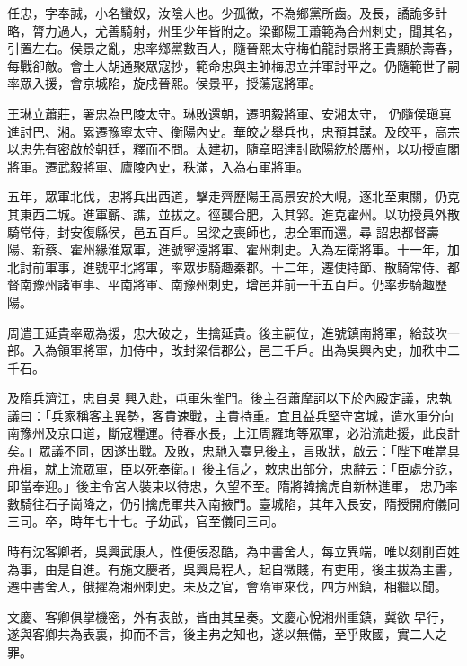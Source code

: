 \begin{pinyinscope}
 任忠，字奉誠，小名蠻奴，汝陰人也。少孤微，不為鄉黨所齒。及長，譎詭多計略，膂力過人，尤善騎射，州里少年皆附之。梁鄱陽王蕭範為合州刺史，聞其名，引置左右。侯景之亂，忠率鄉黨數百人，隨晉熙太守梅伯龍討景將王貴顯於壽春，每戰卻敵。會土人胡通聚眾寇抄，範命忠與主帥梅思立并軍討平之。仍隨範世子嗣率眾入援，會京城陷，旋戍晉熙。侯景平，授蕩寇將軍。



 王琳立蕭莊，署忠為巴陵太守。琳敗還朝，遷明毅將軍、安湘太守，
 仍隨侯瑱真進討巴、湘。累遷豫寧太守、衡陽內史。華皎之舉兵也，忠預其謀。及皎平，高宗以忠先有密啟於朝廷，釋而不問。太建初，隨章昭達討歐陽紇於廣州，以功授直閣將軍。遷武毅將軍、廬陵內史，秩滿，入為右軍將軍。



 五年，眾軍北伐，忠將兵出西道，擊走齊歷陽王高景安於大峴，逐北至東關，仍克其東西二城。進軍蘄、譙，並拔之。徑襲合肥，入其郛。進克霍州。以功授員外散騎常侍，封安復縣侯，邑五百戶。呂梁之喪師也，忠全軍而還。尋
 詔忠都督壽陽、新蔡、霍州緣淮眾軍，進號寧遠將軍、霍州刺史。入為左衛將軍。十一年，加北討前軍事，進號平北將軍，率眾步騎趣秦郡。十二年，遷使持節、散騎常侍、都督南豫州諸軍事、平南將軍、南豫州刺史，增邑并前一千五百戶。仍率步騎趣歷陽。



 周遣王延貴率眾為援，忠大破之，生擒延貴。後主嗣位，進號鎮南將軍，給鼓吹一部。入為領軍將軍，加侍中，改封梁信郡公，邑三千戶。出為吳興內史，加秩中二千石。



 及隋兵濟江，忠自吳
 興入赴，屯軍朱雀門。後主召蕭摩訶以下於內殿定議，忠執議曰：「兵家稱客主異勢，客貴速戰，主貴持重。宜且益兵堅守宮城，遣水軍分向南豫州及京口道，斷寇糧運。待春水長，上江周羅珣等眾軍，必沿流赴援，此良計矣。」眾議不同，因遂出戰。及敗，忠馳入臺見後主，言敗狀，啟云：「陛下唯當具舟楫，就上流眾軍，臣以死奉衛。」後主信之，敕忠出部分，忠辭云：「臣處分訖，即當奉迎。」後主令宮人裝束以待忠，久望不至。隋將韓擒虎自新林進軍，
 忠乃率數騎往石子崗降之，仍引擒虎軍共入南掖門。臺城陷，其年入長安，隋授開府儀同三司。卒，時年七十七。子幼武，官至儀同三司。



 時有沈客卿者，吳興武康人，性便佞忍酷，為中書舍人，每立異端，唯以刻削百姓為事，由是自進。有施文慶者，吳興烏程人，起自微賤，有吏用，後主拔為主書，遷中書舍人，俄擢為湘州刺史。未及之官，會隋軍來伐，四方州鎮，相繼以聞。



 文慶、客卿俱掌機密，外有表啟，皆由其呈奏。文慶心悅湘州重鎮，冀欲
 早行，遂與客卿共為表裏，抑而不言，後主弗之知也，遂以無備，至乎敗國，實二人之罪。




\end{pinyinscope}
